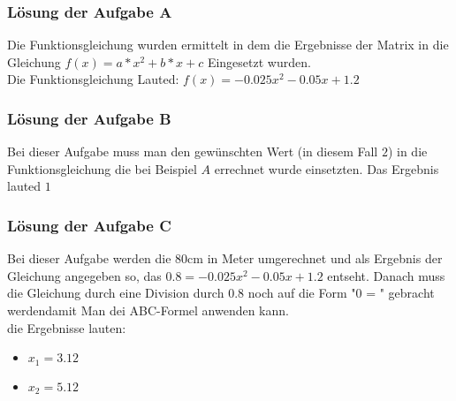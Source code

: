 

\subsubsection{Lösung der Aufgabe A}
Die Funktionsgleichung wurden ermittelt in dem die Ergebnisse der Matrix in die Gleichung $f(x)=a*x^2+b*x+c$ Eingesetzt wurden.\\
Die Funktionsgleichung Lauted: $f(x)=-0.025x^2-0.05x+1.2$
\subsubsection{Lösung der Aufgabe B}
Bei dieser Aufgabe muss man den gewünschten Wert (in diesem Fall $2$) in die Funktionsgleichung die bei Beispiel $A$ errechnet wurde einsetzten.
Das Ergebnis lauted $1$
\subsubsection{Lösung der Aufgabe C}
Bei dieser Aufgabe werden die 80cm in Meter umgerechnet und als Ergebnis der Gleichung angegeben so, das $0.8 = -0.025x^2-0.05x+1.2$ entseht.
Danach muss die Gleichung durch eine Division durch $0.8$ noch auf die Form "0 = " gebracht werdendamit Man dei ABC-Formel anwenden kann.\\
die Ergebnisse lauten:
\begin{itemize}
    \item $x_1 = 3.12$
    \item $x_2 = 5.12$
\end{itemize}